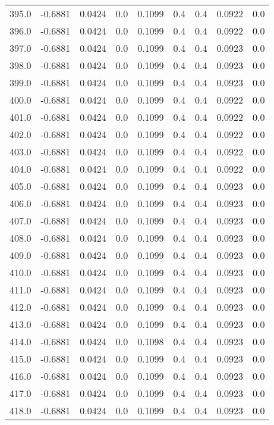 \begin{longtable}{lrrrrrrrr}
395.0 & -0.6881 & 0.0424 & 0.0 & 0.1099 & 0.4 & 0.4 & 0.0922 & 0.0 \\
396.0 & -0.6881 & 0.0424 & 0.0 & 0.1099 & 0.4 & 0.4 & 0.0922 & 0.0 \\
397.0 & -0.6881 & 0.0424 & 0.0 & 0.1099 & 0.4 & 0.4 & 0.0923 & 0.0 \\
398.0 & -0.6881 & 0.0424 & 0.0 & 0.1099 & 0.4 & 0.4 & 0.0923 & 0.0 \\
399.0 & -0.6881 & 0.0424 & 0.0 & 0.1099 & 0.4 & 0.4 & 0.0923 & 0.0 \\
400.0 & -0.6881 & 0.0424 & 0.0 & 0.1099 & 0.4 & 0.4 & 0.0922 & 0.0 \\
401.0 & -0.6881 & 0.0424 & 0.0 & 0.1099 & 0.4 & 0.4 & 0.0922 & 0.0 \\
402.0 & -0.6881 & 0.0424 & 0.0 & 0.1099 & 0.4 & 0.4 & 0.0922 & 0.0 \\
403.0 & -0.6881 & 0.0424 & 0.0 & 0.1099 & 0.4 & 0.4 & 0.0922 & 0.0 \\
404.0 & -0.6881 & 0.0424 & 0.0 & 0.1099 & 0.4 & 0.4 & 0.0922 & 0.0 \\
405.0 & -0.6881 & 0.0424 & 0.0 & 0.1099 & 0.4 & 0.4 & 0.0923 & 0.0 \\
406.0 & -0.6881 & 0.0424 & 0.0 & 0.1099 & 0.4 & 0.4 & 0.0923 & 0.0 \\
407.0 & -0.6881 & 0.0424 & 0.0 & 0.1099 & 0.4 & 0.4 & 0.0923 & 0.0 \\
408.0 & -0.6881 & 0.0424 & 0.0 & 0.1099 & 0.4 & 0.4 & 0.0923 & 0.0 \\
409.0 & -0.6881 & 0.0424 & 0.0 & 0.1099 & 0.4 & 0.4 & 0.0923 & 0.0 \\
410.0 & -0.6881 & 0.0424 & 0.0 & 0.1099 & 0.4 & 0.4 & 0.0923 & 0.0 \\
411.0 & -0.6881 & 0.0424 & 0.0 & 0.1099 & 0.4 & 0.4 & 0.0923 & 0.0 \\
412.0 & -0.6881 & 0.0424 & 0.0 & 0.1099 & 0.4 & 0.4 & 0.0923 & 0.0 \\
413.0 & -0.6881 & 0.0424 & 0.0 & 0.1099 & 0.4 & 0.4 & 0.0923 & 0.0 \\
414.0 & -0.6881 & 0.0424 & 0.0 & 0.1098 & 0.4 & 0.4 & 0.0923 & 0.0 \\
415.0 & -0.6881 & 0.0424 & 0.0 & 0.1099 & 0.4 & 0.4 & 0.0923 & 0.0 \\
416.0 & -0.6881 & 0.0424 & 0.0 & 0.1099 & 0.4 & 0.4 & 0.0923 & 0.0 \\
417.0 & -0.6881 & 0.0424 & 0.0 & 0.1099 & 0.4 & 0.4 & 0.0923 & 0.0 \\
418.0 & -0.6881 & 0.0424 & 0.0 & 0.1099 & 0.4 & 0.4 & 0.0923 & 0.0 \\

\end{longtable}
